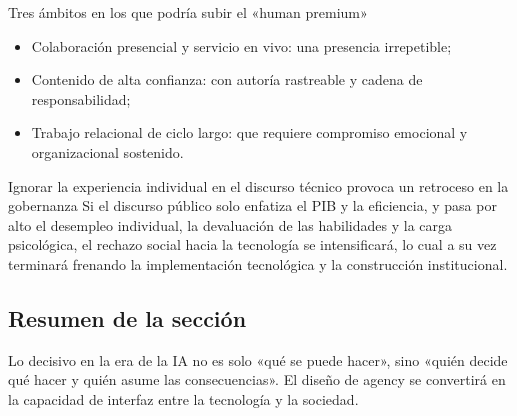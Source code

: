 \begin{knowledgebox}{Tres ámbitos en los que podría subir el «human premium»}
\begin{itemize}[leftmargin=1.5em]
    \item Colaboración presencial y servicio en vivo: una presencia irrepetible;
    \item Contenido de alta confianza: con autoría rastreable y cadena de responsabilidad;
    \item Trabajo relacional de ciclo largo: que requiere compromiso emocional y organizacional sostenido.
\end{itemize}
\end{knowledgebox}

\begin{warningbox}{Ignorar la experiencia individual en el discurso técnico provoca un retroceso en la gobernanza}
Si el discurso público solo enfatiza el PIB y la eficiencia, y pasa por alto el desempleo individual, la devaluación de las habilidades y la carga psicológica, el rechazo social hacia la tecnología se intensificará, lo cual a su vez terminará frenando la implementación tecnológica y la construcción institucional.
\end{warningbox}

\subsection{Resumen de la sección}

Lo decisivo en la era de la IA no es solo «qué se puede hacer», sino «quién decide qué hacer y quién asume las consecuencias». El diseño de agency se convertirá en la capacidad de interfaz entre la tecnología y la sociedad.
